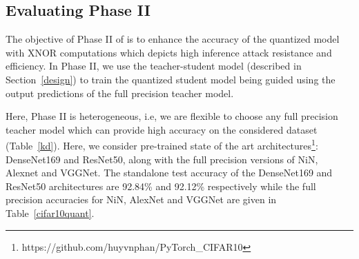 \subsection{Evaluating Phase II}

The objective of Phase II of \method\hspace{0.02in} is to enhance the accuracy of the quantized model with XNOR computations which depicts high inference attack resistance and efficiency.
In Phase II, we use the teacher-student model (described in Section~\ref{design}) to train the quantized student model being guided using the output predictions of the full precision teacher model.

Here, Phase II is heterogeneous, i.e, we are flexible to choose any full precision teacher model which can provide high accuracy on the considered dataset (Table~\ref{kd}).
Here, we consider pre-trained state of the art architectures\footnote{https://github.com/huyvnphan/PyTorch\_CIFAR10}: DenseNet169 and ResNet50, along with the full precision versions of NiN, Alexnet and VGGNet.
The standalone test accuracy of the DenseNet169 and ResNet50 architectures are 92.84\% and 92.12\% respectively while the full precision accuracies for NiN, AlexNet and VGGNet are given in Table~\ref{cifar10quant}.


